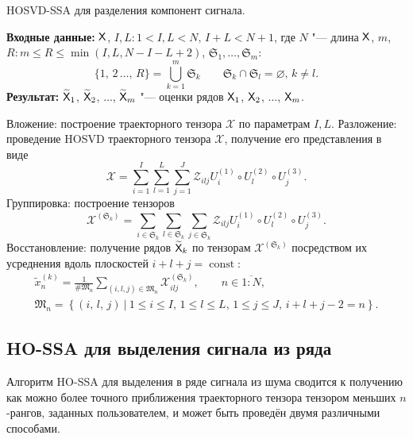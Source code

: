 \documentclass[specialist,
  substylefile=spbu.rtx,
subf,href,colorlinks=true, 12pt]{disser}
\theoremstyle{plain}
\theoremstyle{definition}
\theoremstyle{remark}
\newcommand{\Input}{\textbf{Входные данные: }}
\newcommand{\Output}{\textbf{Результат: }}
\begin{document}
\begin{algorithm}[!h]
  \caption{HOSVD-SSA для разделения компонент сигнала.}
  \label{alg:hosvd-ssa-components}
  \Input $\mathsf{X}$, $I,L: 1< I,L < N,\, I + L < N + 1$, где $N$ "--- длина $\mathsf{X}$,
  $m$,\linebreak $R: m \leqslant R\leqslant \min(I, L, N-I-L+2)$,
  $\mathfrak{S}_1, \ldots, \mathfrak{S}_m$:
  \[
    \{1,\, 2\,\ldots,\, R\}=\bigcup_{k=1}^{m}\mathfrak{S}_k \qquad \mathfrak{S}_k\cap \mathfrak{S}_l =\varnothing,\,
    k\ne l.
  \]
  \Output $\widetilde{\mathsf{X}}_1$, $\widetilde{\mathsf{X}}_2$, $\ldots$, $\widetilde{\mathsf{X}}_m$ "--- оценки рядов
  $\mathsf{X}_1$, $\mathsf{X}_2$, $\ldots$, $\mathsf{X}_m$.
  \begin{algorithmic}[1]
    \State \label{alg:first-step}
    Вложение: построение траекторного тензора $\mathcal{X}$ по параметрам $I, L$.
    \State \label{alg:second-step}
    Разложение: проведение HOSVD траекторного тензора $\mathcal{X}$, получение его представления в виде
    \begin{equation}
      \mathcal{X}=\sum_{i=1}^{I} \sum_{l=1}^{L} \sum_{j=1}^{J} \mathcal{Z}_{ilj} U^{(1)}_{i}
      \circ U^{(2)}_{l} \circ U^{(3)}_{j}.
      \label{eq:trajectory-hosvd}
    \end{equation}
    \State Группировка: построение тензоров
    \begin{equation*}
      \mathcal{X}^{(\mathfrak{S}_k)}=\sum_{i \in \mathfrak{S}_k} \sum_{l\in \mathfrak{S}_k} \sum_{j\in \mathfrak{S}_k}
      \mathcal{Z}_{ilj} U^{(1)}_{i}\circ U^{(2)}_{l} \circ U^{(3)}_{j}.
    \end{equation*}
    \State Восстановление: получение рядов $\widetilde{\mathsf{X}}_k$ по тензорам
    $\mathcal{X}^{(\mathfrak{S}_k)}$ посредством их усреднения вдоль
    плоскостей $i+l+j=\operatorname{const}$:
    \begin{gather*}
      \tilde{x}^{(k)}_n=\frac{1}{\#\mathfrak{M}_n}\sum_{(i,l,j)\in \mathfrak{M}_n} \mathcal{X}^{(\mathfrak{S}_k)}_{ilj},\qquad n\in \overline{1:N},         \\
      \mathfrak{M}_n=\left\{(i,\, l,\, j)~\Big|~1\leqslant i \leqslant I,\, 1\leqslant l \leqslant L,\, 1\leqslant j \leqslant J,\, i+l+j-2=n\right\}.
    \end{gather*}
  \end{algorithmic}
\end{algorithm}


\subsection{HO-SSA для выделения сигнала из ряда}\label{subsec:ho-ssa-signal}
Алгоритм HO-SSA для выделения в ряде сигнала из шума сводится к получению
как можно более точного приближения траекторного тензора тензором меньших $n$-рангов, заданных пользователем, и
может быть проведён двумя различными способами.
\end{document}
